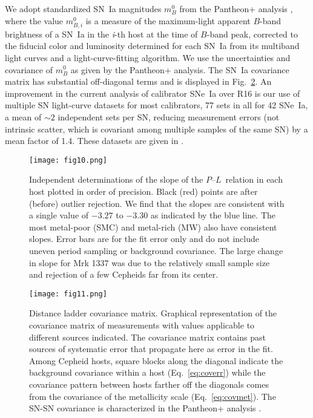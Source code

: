 \documentclass[12pt]{aastex631}
\newcommand{\PLs}{$P$--$L$\ }
\begin{document}
We adopt standardized SN~Ia magnitudes $m_{B}^0$ from the Pantheon+ analysis \citep{Scolnic:2021,Brout:2022}, where the value $m_{B,i}^0$ is a measure of the maximum-light apparent $B$-band brightness of a SN~Ia in the {\it i}-th host at the time of $B$-band peak, corrected to the fiducial color and luminosity determined for each SN~Ia from its multiband light curves and a light-curve-fitting algorithm.  We use the uncertainties and covariance of $m_{B}^0$ as given by the Pantheon+ analysis.  The SN~Ia covariance matrix has substantial off-diagonal terms and is displayed in Fig.~\ref{fg:covarlo}.  An improvement in the current analysis of calibrator SNe~Ia over R16 is our use of multiple SN light-curve datasets for most calibrators, 77 sets in all for 42 SNe~Ia, a mean of $\sim 2$ independent sets per SN, reducing measurement errors (not intrinsic scatter, which is covariant among multiple samples of the same SN) by a mean factor of 1.4.  These datasets are given in \citet{Scolnic:2021}.  

\clearpage

\begin{figure}[t]   
\begin{center}
\texttt{[image: fig10.png]}
\end{center}
\caption{\label{fg:slope} Independent determinations of the slope of the \PLs relation in each host plotted in order of precision.  Black (red) points are after (before) outlier rejection. We find that the slopes are consistent with a single value of $-3.27$ to $-3.30$ as indicated by the blue line.  The most metal-poor (SMC) and metal-rich (MW) also have consistent slopes. Error bars are for the fit error only and do not include uneven period sampling or background covariance.  The large change in slope for Mrk 1337 was due to the relatively small sample size and rejection of a few Cepheids far from its center.}
\end{figure}

\begin{figure}[b]   
\begin{center}
\texttt{[image: fig11.png]}
\end{center}
\caption{\label{fg:covarlo} Distance ladder covariance matrix.  Graphical representation of the covariance matrix of measurements with values applicable to different sources indicated.  The covariance matrix contains past sources of systematic error that propagate here as error in the fit.  Among Cepheid hosts, square blocks along the diagonal indicate the background covariance within a host (Eq.~\ref{eq:coverr}) while the covariance pattern between hosts farther off the diagonals comes from the covariance of the metallicity scale (Eq.~\ref{eq:covmet}).  The SN-SN covariance is characterized in the Pantheon+ analysis \citep{Scolnic:2021,Brout:2022}.}
\end{figure}
\end{document}
